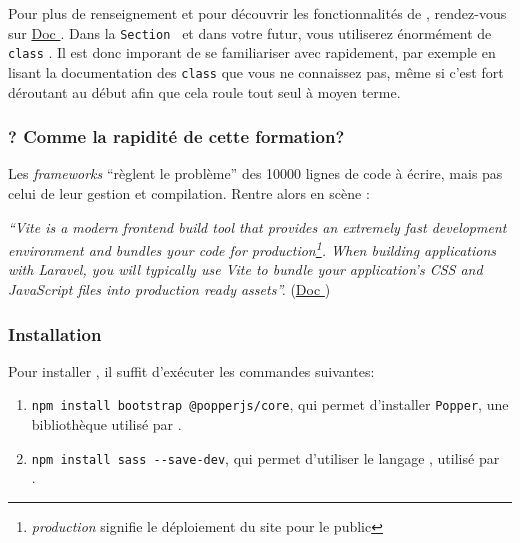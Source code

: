 Pour plus de renseignement et pour découvrir les fonctionnalités de \bs{}, rendez-vous sur \href{https://getbootstrap.com/docs/5.3/getting-started/introduction/}{Doc \bs{}}. Dans la \texttt{Section } et dans votre futur, vous utiliserez énormément de \verb|class| \bs. Il est donc imporant de se familiariser avec rapidement, par exemple en lisant la documentation des \verb|class| que vous ne connaissez pas, même si c'est fort déroutant au début afin que cela roule tout seul à moyen terme.

\subsubsection[Vite][laravel.com/docs/10.x/vite\#introduction]{\vite{}? Comme la rapidité de cette formation?}
Les \textit{frameworks} ``règlent le problème'' des 10000 lignes de code à écrire, mais pas celui de leur gestion et compilation. Rentre alors en scène \vite:

\textit{``Vite is a modern frontend build tool that provides an extremely fast development environment and bundles your code for production\footnote{\textit{production} signifie le déploiement du site pour le public}. When building applications with Laravel, you will typically use Vite to bundle your application's CSS and JavaScript files into production ready assets''.} (\href{https://laravel.com/docs/10.x/vite#introduction}{Doc \laravel{}})

\subsubsection[Installation]{Installation}

Pour installer \bs{}, il suffit d'exécuter les commandes suivantes:
\begin{enumerate}
    \item \verb|npm install bootstrap @popperjs/core|, qui permet d'installer \verb|Popper|, une bibliothèque \js{} utilisé par \bs{}.
    \item \verb|npm install sass --save-dev|, qui permet d'utiliser le langage \sass{}, utilisé par \\ \bs{}.
\end{enumerate}

